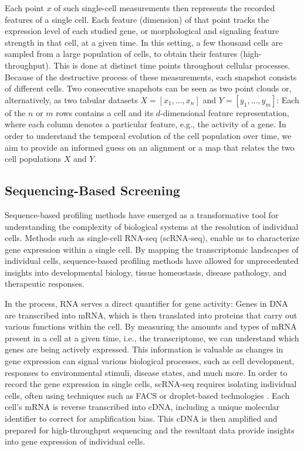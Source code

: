 Each point $x$ of such single-cell measurements then represents the recorded features of a single cell. Each feature (dimension) of that point tracks the expression level of each studied gene, or morphological and signaling feature strength in that cell, at a given time. In this setting, a few thousand cells are sampled from a large population of cells, to obtain their features (high-throughput). This is done at distinct time points throughout cellular processes. Because of the destructive process of these measurements, each snapshot consists of different cells.
Two consecutive snapshots can be seen as two point clouds %
or, alternatively, as two tabular datasets $X = [x_1,\dots, x_n]$ and $Y=[y_1, \dots, y_m]$: Each of the $n$ or $m$ rows contains a cell and its $d$-dimensional feature representation, where each column denotes a particular feature, e.g., the activity of a gene.
In order to understand the temporal evolution of the cell population over time, we aim to provide an informed guess on an alignment or a map that relates the two cell populations $X$ and $Y$.

\subsection{Sequencing-Based Screening}
\label{sec:background_sequencing}

Sequence-based profiling methods have emerged as a transformative tool for understanding the complexity of biological systems at the resolution of individual cells. Methods such as single-cell \acrlong{RNA-seq} (scRNA-seq), enable us to characterize gene expression within a single cell.
By mapping the transcriptomic landscapes of individual cells, sequence-based profiling methods have allowed for unprecedented insights into developmental biology, tissue homeostasis, disease pathology, and therapeutic responses.

In the process, RNA serves a direct quantifier for gene activity: Genes in DNA are transcribed into \acrfull{mRNA}, which is then translated into proteins that carry out various functions within the cell.
By measuring the amounts and types of mRNA present in a cell at a given time, i.e., the transcriptome, we can understand which genes are being actively expressed. This information is valuable as changes in gene expression can signal various biological processes, such as cell development, responses to environmental stimuli, disease states, and much more. 
In order to record the gene expression in single cells, scRNA-seq requires isolating individual cells, often using techniques such as \acrfull{FACS} \citep{julius1972demonstration} or droplet-based technologies \citep{brouzes2009droplet, mazutis2013single, debs2012functional}. Each cell's mRNA is reverse transcribed into \acrfull{cDNA}, including a unique molecular identifier to correct for amplification bias.
This cDNA is then amplified and prepared for high-throughput sequencing and the resultant data provide insights into gene expression of individual cells.


